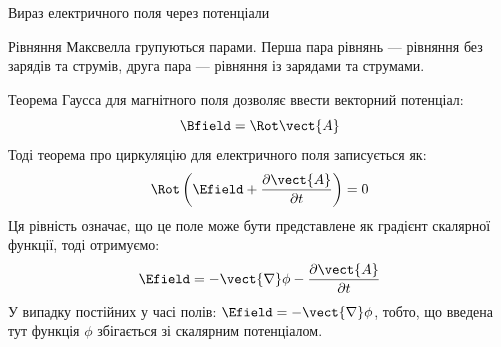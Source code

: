 \documentclass[onlytextwidth]{beamer}
\begin{document}
\begin{frame}{Вираз електричного поля через потенціали}{}
	\renewcommand{\baselinestretch}{0.99}
	\begin{block}{}\justifying
		Рівняння Максвелла групуються парами. \alert{Перша пара рівнянь} --- рівняння \alert{без зарядів та струмів}, \alert{друга пара} --- рівняння
		\alert{із зарядами та струмами}.
	\end{block}
	\begin{block}{}
		Теорема Гаусса для магнітного поля дозволяє ввести векторний потенціал:
		\begin{equation*}
			\Bfield=\Rot\vect{A}
		\end{equation*}
		Тоді теорема про циркуляцію для електричного поля записується як:
		\begin{equation*}
			\Rot\left(\Efield  + \frac{\partial\vect{A}}{\partial t}\right) = 0
		\end{equation*}
		Ця рівність означає, що це
		поле може бути представлене як градієнт скалярної функції, тоді отримуємо:
		\begin{equation*}
			\Efield = -\vect{\nabla}\phi - \frac{\partial\vect{A}}{\partial t}
		\end{equation*}
		У випадку постійних у часі полів: $\Efield = -\vect{\nabla}\phi $, тобто, що введена тут функція $\phi$
		збігається зі скалярним потенціалом.
	\end{block}
\end{frame}
\end{document}

